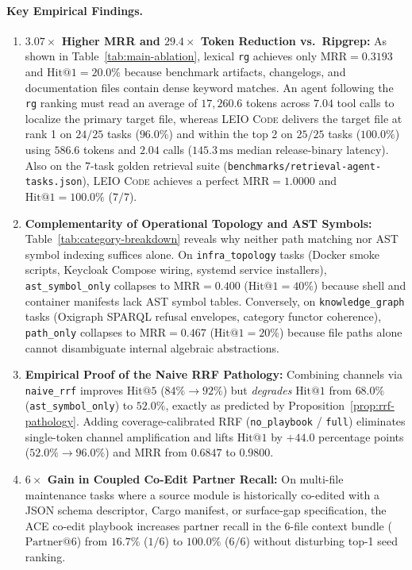 \documentclass[11pt]{article}
\begin{document}
\paragraph{Key Empirical Findings.}
\begin{enumerate}
    \item \textbf{$3.07\times$ Higher MRR and $29.4\times$ Token Reduction vs.\ Ripgrep:} As shown in Table~\ref{tab:main-ablation}, lexical \texttt{rg} achieves only $\text{MRR} = 0.3193$ and $\text{Hit@1} = 20.0\%$ because benchmark artifacts, changelogs, and documentation files contain dense keyword matches. An agent following the \texttt{rg} ranking must read an average of $17{,}260.6$ tokens across $7.04$ tool calls to localize the primary target file, whereas \textsc{LEIO Code} delivers the target file at rank 1 on $24/25$ tasks ($96.0\%$) and within the top 2 on $25/25$ tasks ($100.0\%$) using $586.6$ tokens and $2.04$ calls ($145.3\,\text{ms}$ median release-binary latency). Also on the 7-task golden retrieval suite (\texttt{benchmarks/retrieval-agent-tasks.json}), \textsc{LEIO Code} achieves a perfect $\text{MRR} = 1.0000$ and $\text{Hit@1} = 100.0\%$ ($7/7$).
    \item \textbf{Complementarity of Operational Topology and AST Symbols:} Table~\ref{tab:category-breakdown} reveals why neither path matching nor AST symbol indexing suffices alone. On \texttt{infra\_topology} tasks (Docker smoke scripts, Keycloak Compose wiring, systemd service installers), \texttt{ast\_symbol\_only} collapses to $\text{MRR} = 0.400$ ($\text{Hit@1} = 40\%$) because shell and container manifests lack AST symbol tables. Conversely, on \texttt{knowledge\_graph} tasks (Oxigraph SPARQL refusal envelopes, category functor coherence), \texttt{path\_only} collapses to $\text{MRR} = 0.467$ ($\text{Hit@1} = 20\%$) because file paths alone cannot disambiguate internal algebraic abstractions.
    \item \textbf{Empirical Proof of the Naive RRF Pathology:} Combining channels via \texttt{naive\_rrf} improves $\text{Hit@5}$ ($84\% \to 92\%$) but \emph{degrades} $\text{Hit@1}$ from $68.0\%$ (\texttt{ast\_symbol\_only}) to $52.0\%$, exactly as predicted by Proposition~\ref{prop:rrf-pathology}. Adding coverage-calibrated RRF (\texttt{no\_playbook} / \texttt{full}) eliminates single-token channel amplification and lifts $\text{Hit@1}$ by $+44.0$ percentage points ($52.0\% \to 96.0\%$) and $\text{MRR}$ from $0.6847$ to $0.9800$.
    \item \textbf{$6\times$ Gain in Coupled Co-Edit Partner Recall:} On multi-file maintenance tasks where a source module is historically co-edited with a JSON schema descriptor, Cargo manifest, or surface-gap specification, the ACE co-edit playbook increases partner recall in the 6-file context bundle ($\text{Partner@6}$) from $16.7\%$ ($1/6$) to $100.0\%$ ($6/6$) without disturbing top-1 seed ranking.
\end{enumerate}
\end{document}
